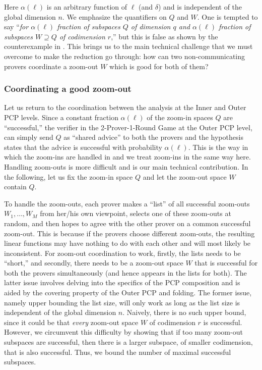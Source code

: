\documentclass{toc}
\begin{document}
\medskip
Here $\alpha(\ell)$ is an arbitrary function of $\ell$ (and $\delta$) and is independent of the global dimension $n$.
We emphasize the quantifiers on $Q$ and $W$. One is tempted to say ``{\it for $\alpha(\ell)$ fraction of subspaces $Q$ of dimension $q$ and $\alpha(\ell)$
fraction of subspaces $W \supseteq Q$ of codimension $r$},'' but this is false as shown by the counterexample in .
This brings us to the main technical challenge that we must overcome to make the reduction go through: how can two non-communicating provers coordinate a zoom-out $W$ which is good for both of them?

\subsubsection{Coordinating a good zoom-out}\label{sec:coordinate_zoom_out}
 Let us return to the coordination between
 the analysis at the Inner and Outer PCP levels.
Since a constant fraction $\alpha(\ell)$ of the zoom-in spaces $Q$ are ``successful,'' the
verifier in the 2-Prover-1-Round Game at the Outer PCP level, can simply send $Q$ as ``shared advice'' to both the provers and the hypothesis states that the advice is successful with probability
$\alpha(\ell)$. This is the way in which the zoom-ins are handled in \cite{KMS}
and we treat zoom-ins in the same way here. %
Handling zoom-outs is more difficult and is
our main technical contribution. In the following,
let us fix the zoom-in space $Q$ and let the zoom-out space $W$ contain $Q$.

\smallskip To handle the zoom-outs, each prover makes a ``list'' of all
successful zoom-outs $W_1, \ldots, W_M$ from her/his own viewpoint,
selects one of these zoom-outs at random, and then hopes to agree with
the other prover on a common successful zoom-out. This is because if the provers choose
different zoom-outs, the resulting linear functions may have nothing to do with
each other and will most likely be inconsistent. For zoom-out coordination to work,
firstly, the lists needs to be ``short,'' and secondly, there needs to
be a zoom-out space $W$ that is successful for both the provers
simultaneously (and hence appears in the lists for both). The latter
issue involves delving into the specifics of the PCP composition and
is aided by the covering property of the Outer PCP and folding.
The former issue, namely upper bounding
the list size, will only work as long as the list size is independent
of the global dimension $n$.  Naively, there is no such upper bound,
since it could be that {\it every} zoom-out space $W$ of codimension %
$r$ is successful. However, we circumvent this difficulty by showing
that if too many zoom-out subspaces are successful, then there is a
larger subspace, of smaller codimension, that is also
successful. Thus, we bound the number of maximal successful subspaces.
\end{document}
